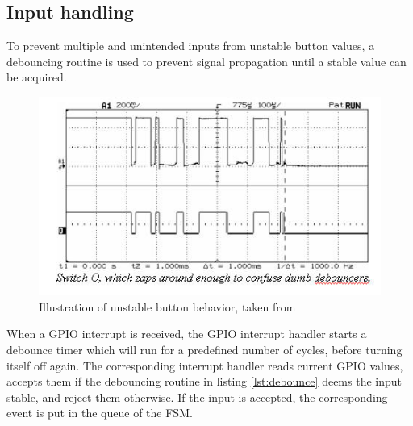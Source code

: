 \subsection{Input handling}
To prevent multiple and unintended inputs from unstable button values, a debouncing routine is used to prevent signal propagation until a stable value can be acquired.

\begin{figure}[h]
    \includegraphics{figures/debounceswitcho.jpg}
    \caption{Illustration of unstable button behavior, taken from \cite{debouncer}}
\end{figure}
When a GPIO interrupt is received, the GPIO interrupt handler starts a debounce timer which will run for a predefined number of cycles, before turning itself off again.
The corresponding interrupt handler reads current  GPIO values, accepts them if the debouncing routine in listing \ref{lst:debounce} deems the input stable, and reject them otherwise.
If the input is accepted, the corresponding event is put in the queue of the FSM.



